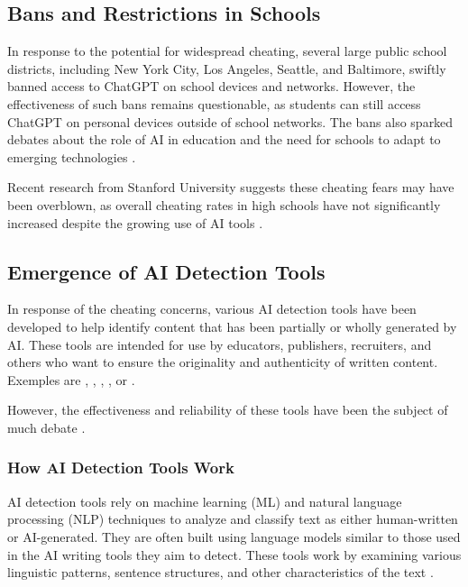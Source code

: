 \documentclass{article}
\begin{document}
\subsection{Bans and Restrictions in Schools}
In response to the potential for widespread cheating,
several large public school districts, including New York City,
Los Angeles, Seattle, and Baltimore, swiftly banned access to
ChatGPT on school devices and networks.
However, the effectiveness of such bans remains questionable,
as students can still access ChatGPT on personal devices outside
of school networks.
The bans also sparked debates about the role of AI
in education and the need for schools to adapt to emerging
technologies
\cite{missouri2023chatgpt} \cite{reddit_chatgpt_academic_purposes}.

Recent research from Stanford University suggests these cheating fears
may have been overblown, as overall cheating rates in high schools have
not significantly increased despite the growing use of AI tools
\cite{nytimes_chatbot_cheating}.

\subsection{Emergence of AI Detection Tools}
In response of the cheating concerns, various AI detection tools
have been developed to help identify content that has been partially
or wholly generated by AI.
These tools are intended for use by educators, publishers,
recruiters, and others who want to ensure the originality
and authenticity of written content.
Exemples are \cite[Originality.ai]{originality_ai},
\cite[Copyleaks]{copyleaks}, \cite[Quillbot]{quillbot},
\cite[GPTZero]{gptzero}, or \cite[Compilatio]{compilatio_ia_detecteur}.

However, the effectiveness and reliability of these tools
have been the subject of much debate
\cite{scribbr_ai_detectors} \cite{contadu_ai_detection} \cite{biomedcentral_ai_detection}.



\subsubsection{How AI Detection Tools Work}
AI detection tools rely on machine learning (ML)
and natural language processing (NLP) techniques to analyze and
classify text as either human-written or AI-generated.
They are often built using language models similar to those used
in the AI writing tools they aim to detect.
These tools work by examining various linguistic patterns, sentence structures,
and other characteristics of the text
\cite{surferseo_ai_content_detectors}
\cite{scribbr_ai_detectors}
\cite{contadu_ai_detection}.
\end{document}
